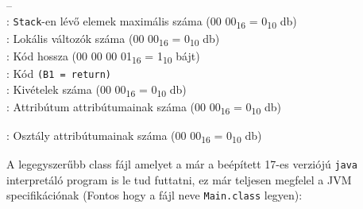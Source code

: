 \begin{compactitem}
\begin{compactitem}
\begin{compactitem}
\begin{compactitem}
            \setlength\itemsep{0px}
                \item[–]       \\
                : \lstinline{Stack}-en lévő elemek maximális száma (00 00\textsubscript{16} = 0\textsubscript{10} db)  \\
                : Lokális változók száma (00 00\textsubscript{16} = 0\textsubscript{10} db) \\
                : Kód hossza (00 00 00 01\textsubscript{16} = 1\textsubscript{10} bájt) \\
                : Kód \lstinline{(B1 = return)}  \\
                : Kivételek száma (00 00\textsubscript{16} = 0\textsubscript{10} db) \\
                : Attribútum attribútumainak száma (00 00\textsubscript{16} = 0\textsubscript{10} db)
        \end{compactitem}
    \end{compactitem}
\end{compactitem}
\item {}: Osztály attribútumainak száma (00 00\textsubscript{16} = 0\textsubscript{10} db)
\end{compactitem}

A legegyszerűbb class fájl amelyet a már a beépített 17-es verziójú \lstinline{java} interpretáló program is le tud futtatni, ez már teljesen megfelel a JVM specifikációnak (Fontos hogy a fájl neve \lstinline{Main.class} legyen):

